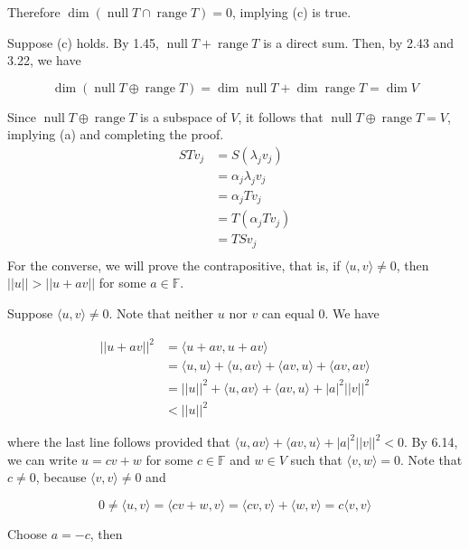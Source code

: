 \documentclass[a4paper]{article}
\newcommand\n{\newpage}
\begin{document}
Therefore $\operatorname{dim}(\operatorname{null} T \cap \operatorname{range} T) = 0$, implying (c) is true.

Suppose (c) holds. By 1.45, $\operatorname{null} T + \operatorname{range} T$ is a direct sum. Then, by 2.43 and 3.22, we have

$$ \operatorname{dim} (\operatorname{null} T \oplus \operatorname{range} T) = \operatorname{dim} \operatorname{null} T + \operatorname{dim} \operatorname{range} T = \operatorname{dim} V $$

Since $\operatorname{null} T \oplus \operatorname{range} T$ is a subspace of $V$, it follows that $\operatorname{null} T \oplus \operatorname{range} T = V$, implying (a) and completing the proof.
\\


$$ \begin{aligned} STv_j &= S(\lambda_j v_j)\\ &= \alpha_j \lambda_j v_j\\ &= \alpha_j Tv_j\\ &= T(\alpha_j Tv_j)\\ &= TSv_j\\ \end{aligned} $$
\n
For the converse, we will prove the contrapositive, that is, if $\langle u, v \rangle \neq 0$, then $||u|| > ||u + av||$ for some $a \in \mathbb{F}$.

Suppose $\langle u, v \rangle \neq 0$. Note that neither $u$ nor $v$ can equal $0$. We have

$$ \begin{aligned} ||u + av||^2 &= \langle u + av, u + av \rangle\\ &= \langle u, u \rangle + \langle u, av \rangle + \langle av, u \rangle + \langle av, av \rangle\\ &= ||u||^2 + \langle u, av \rangle + \langle av, u \rangle + |a|^2 ||v||^2\\ &< ||u||^2 \end{aligned} $$

where the last line follows provided that $\langle u, av \rangle + \langle av, u \rangle + |a|^2 ||v||^2 < 0$. By 6.14, we can write $u = cv + w$ for some $c \in \mathbb{F}$ and $w \in V$ such that $\langle v, w \rangle = 0$. Note that $c \neq 0$, because $\langle v, v \rangle \neq 0$ and

$$ 0 \neq \langle u, v \rangle = \langle cv + w, v \rangle = \langle cv, v \rangle + \langle w, v \rangle = c \langle v, v \rangle $$

Choose $a = -c$, then
\end{document}
